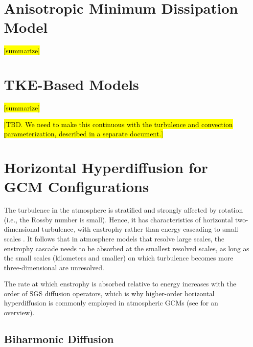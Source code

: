 \documentclass{report}
\begin{document}
\section{Anisotropic Minimum Dissipation Model}

\hl{[summarize]}
\citep{Abkar17a}


\section{TKE-Based Models}

\hl{[summarize]}

\citep{Deardorff80a}

\hl{[TBD. We need to make this continuous with the turbulence and convection parameterization, described in a separate document.]}

\section{Horizontal Hyperdiffusion for GCM Configurations}

The turbulence in the atmosphere is stratified and strongly affected by rotation (i.e., the Rossby number is small). Hence, it has characteristics of horizontal two-dimensional turbulence, with enstrophy rather than energy cascading to small scales \citep[e.g.,][chapter~9]{Vallis06a}. It follows that in atmosphere models that resolve large scales, the enstrophy cascade needs to be absorbed at the smallest resolved scales, as long as the small scales (kilometers and smaller) on which turbulence becomes more three-dimensional are unresolved. 

The rate at which enstrophy is absorbed relative to energy increases with the order of SGS diffusion operators, which is why higher-order horizontal hyperdiffusion is commonly employed in atmospheric GCMs (see \citet{Jablonowski11a} for an overview).

\subsection{Biharmonic Diffusion}
\end{document}
